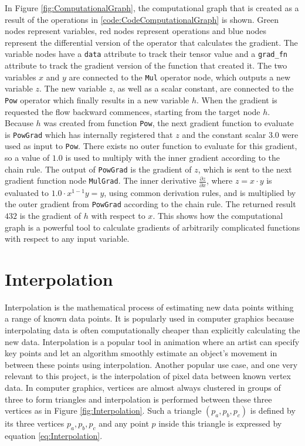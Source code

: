 In Figure \ref{fig:ComputationalGraph}, the computational graph that is created as a result of the operations in \ref{code:CodeComputationalGraph} is shown. Green nodes represent variables, red nodes represent operations and blue nodes represent the differential version of the operator that calculates the gradient. The variable nodes have a \texttt{data} attribute to track their tensor value and a \texttt{grad\_fn} attribute to track the gradient version of the function that created it. The two variables $x$ and $y$ are connected to the \texttt{Mul} operator node, which outputs a new variable $z$. The new variable $z$, as well as a scalar constant, are connected to the \texttt{Pow} operator which finally results in a new variable $h$. When the gradient is requested the flow backward commences, starting from the target node $h$. Because $h$ was created from function \texttt{Pow}, the next gradient function to evaluate is \texttt{PowGrad} which has internally registered that $z$ and the constant scalar $3.0$ were used as input to \texttt{Pow}. There exists no outer function to evaluate for this gradient, so a value of $1.0$ is used to multiply with the inner gradient according to the chain rule. The output of \texttt{PowGrad} is the gradient of $z$, which is sent to the next gradient function node \texttt{MulGrad}. The inner derivative $\frac{\partial z}{\partial x}$, where $z=x\cdot y$ is evaluated to $1.0\cdot x^{1-1}y = y$, using common derivation rules, and is multiplied by the outer gradient from \texttt{PowGrad} according to the chain rule. The returned result $432$ is the gradient of $h$ with respect to $x$. This shows how the computational graph is a powerful tool to calculate gradients of arbitrarily complicated functions with respect to any input variable.

\section{Interpolation}\label{sec:Interpolation}

Interpolation is the mathematical process of estimating new data points withing a range of known data points. It is popularly used in computer graphics because interpolating data is often computationally cheaper than explicitly calculating the new data. Interpolation is a popular tool in animation where an artist can specify key points and let an algorithm smoothly estimate an object's movement in between these points using interpolation. Another popular use case, and one very relevant to this project, is the interpolation of pixel data between known vertex data. In computer graphics, vertices are almost always clustered in groups of three to form triangles and interpolation is performed between these three vertices as in Figure \ref{fig:Interpolation}. Such a triangle $(p_a,p_b,p_c)$ is defined by its three vertices $p_a,p_b,p_c$ and any point $p$ inside this triangle is expressed by equation \ref{eq:Interpolation}.

